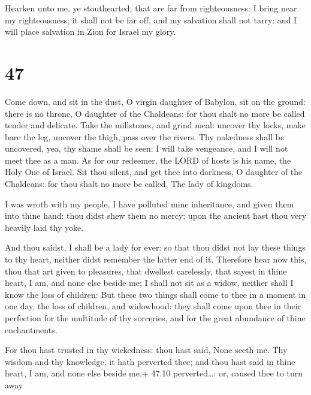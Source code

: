 Hearken unto me, ye stouthearted, that are far from
righteousness:  I bring near my righteousness; it shall not
be far off, and my salvation shall not tarry: and I will place salvation
in Zion for Israel my glory.

\hypertarget{section-46}{%
\section{47}\label{section-46}}

 Come down, and sit in the dust, O virgin daughter of
Babylon, sit on the ground: there is no throne, O daughter of the
Chaldeans: for thou shalt no more be called tender and delicate.
 Take the millstones, and grind meal: uncover thy locks,
make bare the leg, uncover the thigh, pass over the rivers. 
Thy nakedness shall be uncovered, yea, thy shame shall be seen: I will
take vengeance, and I will not meet thee as a man.  As for
our redeemer, the LORD of hosts is his name, the Holy One of Israel.
 Sit thou silent, and get thee into darkness, O daughter of
the Chaldeans: for thou shalt no more be called, The lady of kingdoms.

 I was wroth with my people, I have polluted mine
inheritance, and given them into thine hand: thou didst shew them no
mercy; upon the ancient hast thou very heavily laid thy yoke.

 And thou saidst, I shall be a lady for ever: so that thou
didst not lay these things to thy heart, neither didst remember the
latter end of it.  Therefore hear now this, thou that art
given to pleasures, that dwellest carelessly, that sayest in thine
heart, I am, and none else beside me; I shall not sit as a widow,
neither shall I know the loss of children:  But these two
things shall come to thee in a moment in one day, the loss of children,
and widowhood: they shall come upon thee in their perfection for the
multitude of thy sorceries, and for the great abundance of thine
enchantments.

 For thou hast trusted in thy wickedness: thou hast said,
None seeth me. Thy wisdom and thy knowledge, it hath perverted thee; and
thou hast said in thine heart, I am, and none else beside me.+ 47.10
perverted\ldots: or, caused thee to turn away

